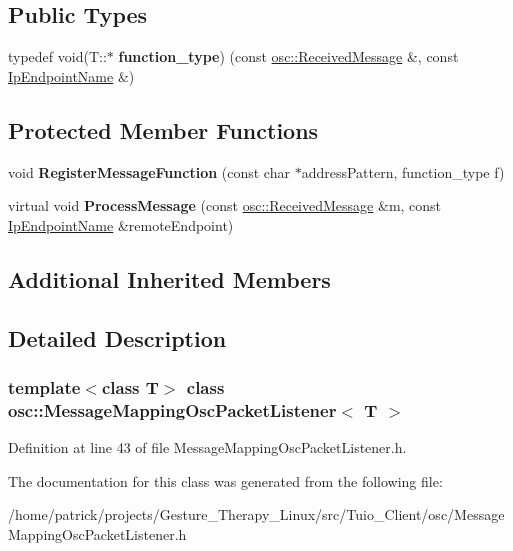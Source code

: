 \subsection*{Public Types}
\begin{DoxyCompactItemize}
\item 
\mbox{\label{classosc_1_1_message_mapping_osc_packet_listener_ac42699983a93c519105122fe24e25ab7}} 
typedef void(T\+::$\ast$ {\bfseries function\+\_\+type}) (const \hyperlink{classosc_1_1_received_message}{osc\+::\+Received\+Message} \&, const \hyperlink{class_ip_endpoint_name}{Ip\+Endpoint\+Name} \&)
\end{DoxyCompactItemize}
\subsection*{Protected Member Functions}
\begin{DoxyCompactItemize}
\item 
\mbox{\label{classosc_1_1_message_mapping_osc_packet_listener_aed3ac1b4ad1e2d9882b49de1da790953}} 
void {\bfseries Register\+Message\+Function} (const char $\ast$address\+Pattern, function\+\_\+type f)
\item 
\mbox{\label{classosc_1_1_message_mapping_osc_packet_listener_a2ee3c1307d98eeec8b1d46d7c34c5bdd}} 
virtual void {\bfseries Process\+Message} (const \hyperlink{classosc_1_1_received_message}{osc\+::\+Received\+Message} \&m, const \hyperlink{class_ip_endpoint_name}{Ip\+Endpoint\+Name} \&remote\+Endpoint)
\end{DoxyCompactItemize}
\subsection*{Additional Inherited Members}


\subsection{Detailed Description}
\subsubsection*{template$<$class T$>$\newline
class osc\+::\+Message\+Mapping\+Osc\+Packet\+Listener$<$ T $>$}



Definition at line 43 of file Message\+Mapping\+Osc\+Packet\+Listener.\+h.



The documentation for this class was generated from the following file\+:\begin{DoxyCompactItemize}
\item 
/home/patrick/projects/\+Gesture\+\_\+\+Therapy\+\_\+\+Linux/src/\+Tuio\+\_\+\+Client/osc/Message\+Mapping\+Osc\+Packet\+Listener.\+h\end{DoxyCompactItemize}
